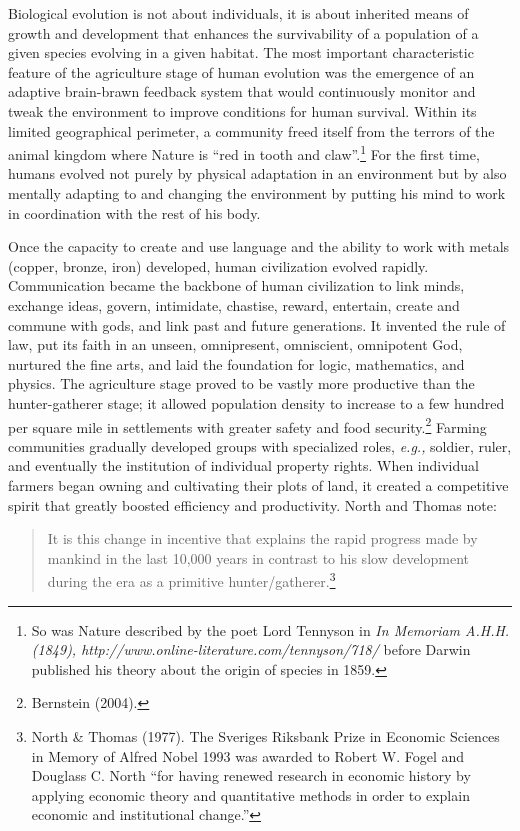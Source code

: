 \begin{multicols}{2}
Biological evolution is not about individuals, it is about inherited means of growth and development that enhances the survivability of a population of a given species evolving in a given habitat. The most important characteristic feature of the agriculture stage of human evolution was the emergence of an adaptive brain-brawn feedback system that would continuously monitor and tweak the environment to improve conditions for human survival. Within its limited geographical perimeter, a community freed itself from the terrors of the animal kingdom where Nature is “red in tooth and claw”.\footnote{So was Nature described by the poet Lord Tennyson in \textit{In Memoriam A.H.H. (1849), http://www.online-literature.com/tennyson/718/} before Darwin published his theory about the origin of species in 1859.} For the first time, humans evolved not purely by physical adaptation in an environment but by also mentally adapting to and changing the environment by putting his mind to work in coordination with the rest of his body.

Once the capacity to create and use language and the ability to work with metals (copper, bronze, iron) developed, human civilization evolved rapidly. Communication became the backbone of human civilization to link minds, exchange ideas, govern, intimidate, chastise, reward, entertain, create and commune with gods, and link past and future generations. It invented the rule of law, put its faith in an unseen, omnipresent, omniscient, omnipotent God, nurtured the fine arts, and laid the foundation for logic, mathematics, and physics. The agriculture stage proved to be vastly more productive than the hunter-gatherer stage; it allowed population density to increase to a few hundred per square mile in settlements with greater safety and food security.\footnote{Bernstein (2004).} Farming communities gradually developed groups with specialized roles, \textit{e.g.,} soldier, ruler, and eventually the institution of individual property rights. When individual farmers began owning and cultivating their plots of land, it created a competitive spirit that greatly boosted efficiency and productivity. North and Thomas note: 

\begin{quote}
It is this change in incentive that explains the rapid progress made by mankind in the last 10,000 years in contrast to his slow development during the era as a primitive hunter/gatherer.\footnote{North \& Thomas (1977). The Sveriges Riksbank Prize in Economic Sciences in Memory of Alfred Nobel 1993 was awarded to Robert W. Fogel and Douglass C. North “for having renewed research in economic history by applying economic theory and quantitative methods in order to explain economic and institutional change.”}
\end{quote}


\end{multicols}

